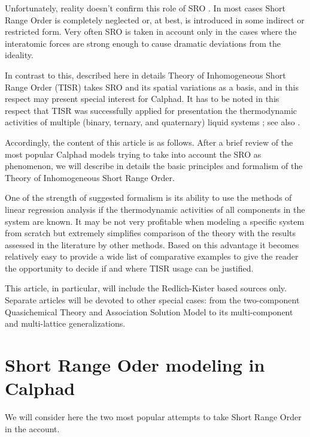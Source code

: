 \documentclass[12pt,abstract]{scrartcl}
\begin{document}
Unfortunately, reality doesn't confirm this role of SRO \cite{Pelton2007, Ansara2000}. In most cases Short Range Order is completely neglected or, at best, is introduced in some indirect or restricted form. Very often SRO is taken in account  only in the cases where the interatomic forces are  strong enough to cause  dramatic deviations from the ideality. 



In contrast to this, described here in details Theory of Inhomogeneous Short Range Order \cite{tisr1988} (TISR)  takes SRO and its spatial variations  as a basis, and in this respect may present special interest for Calphad. It has to be noted in this respect that TISR  was  successfully  applied for presentation the  thermodynamic activities of multiple (binary, ternary, and quaternary) liquid systems \cite{tisr1988, KREMER1985, Vajsburd1996}; see also
\cite{TISR_p2,TISR_p3}.

Accordingly, the content of this article is as follows.  
After a brief review of the most popular Calphad models trying to take into account the SRO as phenomenon, we will describe in details the basic principles and formalism of the Theory of Inhomogeneous Short Range Order. 

One of the strength of suggested formalism is its ability to use the methods of linear regression analysis \cite{Regression2016} if the thermodynamic activities of all components in the  system are known. It may be not very profitable when modeling a specific system from scratch but extremely simplifies  comparison of the  theory with the results assessed in the literature by other  methods. Based on this advantage it becomes relatively easy   
to provide a wide list of comparative examples to give the reader the opportunity to decide if and where TISR usage can be justified. 

This article, in particular, will include the Redlich-Kister based sources only. Separate articles will be devoted to other special cases: from the two-component Quasichemical Theory \cite{TISR_p2} and Association Solution Model \cite{TISR_p3} to  its multi-component and multi-lattice generalizations.

\section{Short Range Oder modeling in Calphad}

We will consider here the two most popular attempts to take Short Range Order in the account.
\end{document}
